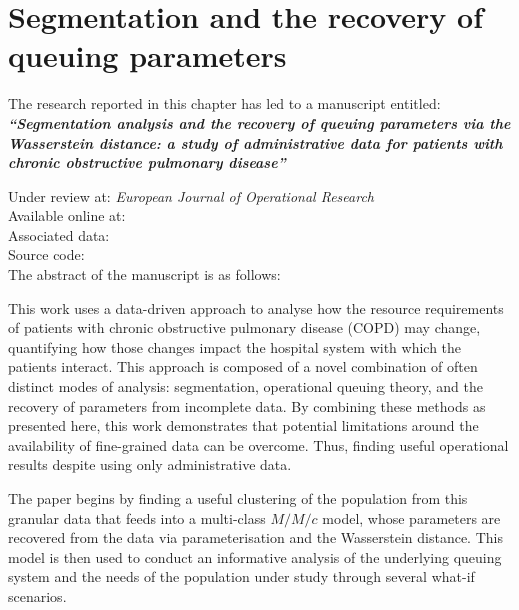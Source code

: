 \chapter{Segmentation and the recovery of queuing parameters}
\label{chp:copd}

\graphicspath{{chapters/copd/paper/img/}}
\renewcommand{\texpath}{chapters/copd/paper/tex}

\begin{center}
    The research reported in this chapter has led to a manuscript
    entitled:\\[1em]

    {%
        \bf\itshape{``Segmentation analysis and the recovery of queuing
                    parameters via the Wasserstein distance: a study of
                    administrative data for patients with chronic obstructive
                    pulmonary disease''}
    }

    Under review at: \emph{European Journal of Operational Research}\\[.5em]

    Available online at: \\
    Associated data: \\
    Source code: \\[1em]

    The abstract of the manuscript is as follows:\\[1em]
\end{center}

This work uses a data-driven approach to analyse how the resource requirements
of patients with chronic obstructive pulmonary disease (COPD) may change,
quantifying how those changes impact the hospital system with which the patients
interact. This approach is composed of a novel combination of often distinct
modes of analysis: segmentation, operational queuing theory, and the recovery of
parameters from incomplete data. By combining these methods as presented here,
this work demonstrates that potential limitations around the availability of
fine-grained data can be overcome. Thus, finding useful operational results
despite using only administrative data.

The paper begins by finding a useful clustering of the population from this
granular data that feeds into a multi-class \(M/M/c\) model, whose parameters
are recovered from the data via parameterisation and the Wasserstein distance.
This model is then used to conduct an informative analysis of the underlying
queuing system and the needs of the population under study through several
what-if scenarios.

